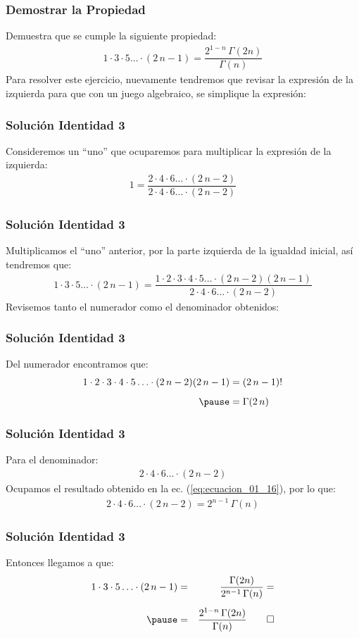 \documentclass[12pt]{beamer}
\begin{document}
\begin{frame}
\frametitle{Demostrar la Propiedad}
Demuestra que se cumple la siguiente propiedad:
\pause
\begin{align*}
1 \cdot 3 \cdot 5 \ldots \cdot (2 \, n - 1) = \dfrac{2^{1-n} \, \Gamma (2 n)}{\Gamma (n)}
\end{align*}
\pause
Para resolver este ejercicio, nuevamente tendremos que revisar la expresión de la izquierda para que con un juego algebraico, se simplique la expresión:
\end{frame}
\begin{frame}
\frametitle{Solución Identidad 3}
Consideremos un \enquote{uno} que ocuparemos para multiplicar la expresión de la izquierda:
\pause
\begin{align*}
1 = \dfrac{ 2 \cdot 4 \cdot 6 \ldots \cdot (2 \, n - 2)}{ 2 \cdot 4 \cdot 6 \ldots \cdot (2 \, n - 2)}
\end{align*}
\end{frame}
\begin{frame}
\frametitle{Solución Identidad 3}
Multiplicamos el \enquote{uno} anterior, por la parte izquierda de la igualdad inicial, así tendremos que:
\pause
{\fontsize{12}{12}\selectfont
\begin{align*}
1 \cdot 3 \cdot 5 \ldots \cdot (2 \, n - 1) = \dfrac{1 \cdot 2 \cdot 3 \cdot 4 \cdot 5 \ldots \cdot (2 \, n - 2)(2 \, n -1)}{2 \cdot 4 \cdot 6 \ldots \cdot (2 \, n - 2)}
\end{align*}}
\pause
Revisemos tanto el numerador como el denominador obtenidos:
\end{frame}
\begin{frame}
\frametitle{Solución Identidad 3}
Del numerador encontramos que:
\pause
\begin{eqnarray*}
\begin{aligned}
1 \cdot 2 \cdot 3 \cdot 4 \cdot 5 \ldots \cdot (2 \, n - 2)(2 \, n - 1) &= (2 \, n - 1)! \\[0.5em] \pause
&= \Gamma (2 \, n)
\end{aligned}
\end{eqnarray*}
\end{frame}
\begin{frame}
\frametitle{Solución Identidad 3}
Para el denominador:
\pause
\begin{align*}
2 \cdot 4 \cdot 6 \ldots \cdot (2 \, n - 2)
\end{align*}
\pause
Ocupamos el resultado obtenido en la ec. (\ref{eq:ecuacion_01_16}), por lo que:
\pause
\begin{align*}
2 \cdot 4 \cdot 6 \ldots \cdot (2 \, n - 2) = 2^{n-1} \, \Gamma (n)
\end{align*}
\end{frame}
\begin{frame}
\frametitle{Solución Identidad 3}
Entonces llegamos a que:
\pause
\begin{eqnarray*}
1 \cdot 3 \cdot 5 \ldots \cdot (2 \, n - 1) &=& \dfrac{\Gamma (2 n)}{2^{n-1} \, \Gamma (n)} = \\[0.5em] \pause
&=& \dfrac{2^{1-n} \, \Gamma(2n)}{\Gamma (n)} \qed
\end{eqnarray*}
\end{frame}
\end{document}
